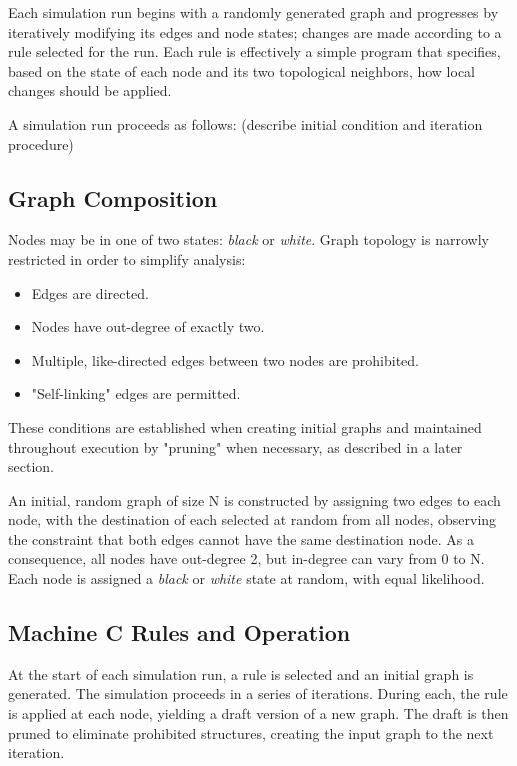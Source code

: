 \documentclass[twoside,twocolumn]{article}
\begin{document}
Each simulation run begins with a randomly generated graph and progresses by
iteratively modifying its edges and node states; changes are made according to a rule selected
for the run. Each rule is effectively a simple program  that specifies, based on the state
of each node and its two topological neighbors, how local changes should be applied.

A simulation run proceeds as follows: (describe initial condition and iteration procedure)

\subsection{Graph Composition}

Nodes may be in one of two states: \textit{black} or \textit{white}.
Graph topology is narrowly restricted in order to simplify analysis:

\begin{itemize}
    \item Edges are directed.
    \item Nodes have out-degree of exactly two.
    \item Multiple, like-directed edges between two nodes are prohibited.
    \item "Self-linking" edges are permitted.
\end{itemize}

These conditions are established when creating initial graphs and maintained
throughout execution by "pruning" when necessary, as described in a later section.

An initial, random graph of size N is constructed by assigning two edges to each node, with
the destination of each selected at random from all nodes, observing the
constraint that both edges cannot have the same destination node. As a consequence,
all nodes have out-degree 2, but in-degree can vary from 0 to N. Each node is assigned
a \textit{black} or \textit{white} state at random, with equal likelihood.

\subsection{Machine \textbf{C} Rules and Operation}

At the start of each simulation run, a rule is selected and an initial graph
is generated.  The simulation proceeds in a series of
iterations. During each, the rule is applied at each node, yielding a draft
version of a new graph. The draft is then pruned to eliminate
prohibited structures, creating the input graph to the next iteration.
\end{document}
